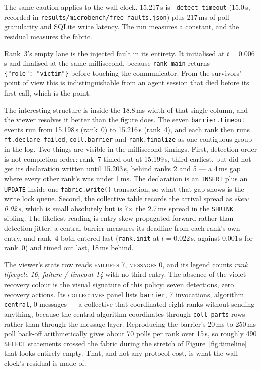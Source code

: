 \documentclass[11pt]{article}
\begin{document}
The same caution applies to the wall clock. 15.217\,s is
\texttt{--detect-timeout} (15.0\,s, recorded in
\texttt{results/microbench/free-faults.json}) plus 217\,ms of poll granularity and SQLite
write latency. The run measures a constant, and the residual measures the fabric.

Rank~3's empty lane is the injected fault in its entirety. It initialised at $t=0.006$\,s
and finalised at the same millisecond, because \texttt{rank\_main} returns
\texttt{\{"role":\ "victim"\}} before touching the communicator. From the survivors' point
of view this is indistinguishable from an agent session that died before its first call,
which is the point.

The interesting structure is inside the 18.8\,ms width of that single column, and the
viewer resolves it better than the figure does. The seven \texttt{barrier.timeout} events
run from 15.198\,s (rank~0) to 15.216\,s (rank~4), and each rank then runs
\texttt{ft.declare\_failed}, \texttt{coll.barrier} and \texttt{rank.finalize} as one
contiguous group in the log. Two things are visible in the millisecond timings. First,
detection order is not completion order: rank~7 timed out at 15.199\,s, third earliest,
but did not get its declaration written until 15.203\,s, behind ranks 2 and 5 --- a 4\,ms
gap where every other rank's was under 1\,ms. The declaration is an \texttt{INSERT} plus
an \texttt{UPDATE} inside one \texttt{fabric.write()} transaction, so what that gap shows
is the write lock queue. Second, the collective table records the arrival spread as
\emph{skew 0.02\,s}, which is small absolutely but is 7$\times$ the 2.7\,ms spread in the
\texttt{SHRINK} sibling. The likeliest reading is entry skew propagated forward rather
than detection jitter: a central barrier measures its deadline from each rank's own entry,
and rank~4 both entered last (\texttt{rank.init} at $t=0.022$\,s, against 0.001\,s for
rank~0) and timed out last, 18\,ms behind.

The viewer's stats row reads \textsc{failures 7}, \textsc{messages 0}, and its legend
counts \emph{rank lifecycle 16, failure / timeout 14} with no third entry. The absence of
the violet recovery colour is the visual signature of this policy: seven detections, zero
recovery actions. Its \textsc{collectives} panel lists \texttt{barrier}, 7 invocations,
algorithm \texttt{central}, 0 messages --- a collective that coordinated eight ranks
without sending anything, because the central algorithm coordinates through
\texttt{coll\_parts} rows rather than through the message layer. Reproducing the barrier's
20\,ms-to-250\,ms poll back-off arithmetically gives about 70 polls per rank over 15\,s,
so roughly 490 \texttt{SELECT} statements crossed the fabric during the stretch of
Figure~\ref{fig:timeline} that looks entirely empty. That, and not any protocol cost, is
what the wall clock's residual is made of.
\end{document}
